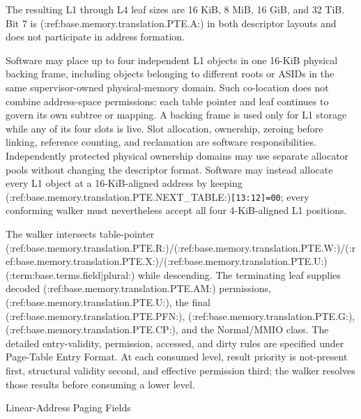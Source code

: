 The resulting L1 through L4 leaf sizes are 16 KiB, 8 MiB, 16 GiB, and 32 TiB. Bit 7 is (:ref:base.memory.translation.PTE.A:) in both descriptor
layouts and does not participate in address formation.

Software may place up to four independent L1 objects in one 16-KiB physical
backing frame, including objects belonging to different roots or ASIDs in the
same supervisor-owned physical-memory domain. Such co-location does not combine
address-space permissions: each table pointer and leaf continues to govern its
own subtree or mapping. A backing frame is used only for L1 storage while any
of its four slots is live. Slot allocation, ownership, zeroing before linking,
reference counting, and reclamation are software responsibilities. Independently
protected physical ownership domains may use separate allocator pools without
changing the descriptor format. Software may instead allocate every L1 object
at a 16-KiB-aligned address by keeping
(:ref:base.memory.translation.PTE.NEXT_TABLE:)\texttt{[13:12]=00}; every conforming walker must nevertheless
accept all four 4-KiB-aligned L1 positions.

The walker intersects table-pointer (:ref:base.memory.translation.PTE.R:)/(:ref:base.memory.translation.PTE.W:)/(:ref:base.memory.translation.PTE.X:)/(:ref:base.memory.translation.PTE.U:) (:term:base.terms.field|plural:) while descending. The
terminating leaf supplies decoded (:ref:base.memory.translation.PTE.AM:) permissions, (:ref:base.memory.translation.PTE.U:), the final (:ref:base.memory.translation.PTE.PFN:),
(:ref:base.memory.translation.PTE.G:), (:ref:base.memory.translation.PTE.CP:), and the Normal/MMIO class. The detailed entry-validity,
permission, accessed, and dirty rules are specified under Page-Table Entry Format. At each consumed level, result
priority is not-present first, structural validity second, and effective permission third; the walker resolves
those results before consuming a lower level.

\begin{BedrockListedFormatDiagram}{Linear-Address Paging Fields}
\end{BedrockListedFormatDiagram}

\clearpage
